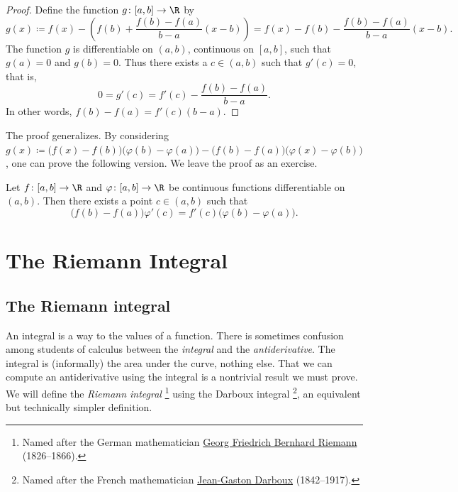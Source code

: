 \begin{proof}
Define the
function $g \colon [a,b] \to \R$ by
\begin{equation*}
g(x) \coloneqq
f(x)-
\left( f(b)+\frac{f(b)-f(a)}{b-a}(x-b) \right)
=
f(x)-
f(b)-\frac{f(b)-f(a)}{b-a}(x-b) .
\end{equation*}
The function $g$ is differentiable on $(a,b)$,
continuous on $[a,b]$, such that $g(a) = 0$ and $g(b) = 0$.  Thus there exists
a
$c \in (a,b)$ such that $g'(c) = 0$, that is,
\begin{equation*}
0 = g'(c) = f'(c)-\frac{f(b)-f(a)}{b-a} .
\end{equation*}
In other words,
$f(b)-f(a) = f'(c)(b-a)$.
\end{proof}

The proof generalizes.  By considering
$g(x) \coloneqq
\bigl(f(x)-f(b)\bigr)
\bigl(\varphi(b)-\varphi(a)\bigr)
-
\bigl(f(b)-f(a)\bigr)
\bigl(\varphi(x)-\varphi(b)\bigr)$,
one can prove the following version.  We leave the proof as an exercise.

\begin{thm} \label{thm:cauchymvt}
Let $f \colon [a,b] \to \R$ and $\varphi \colon [a,b] \to \R$ be continuous
functions
differentiable on $(a,b)$.  Then there exists a point $c \in (a,b)$
such that
\begin{equation*}
\bigl(f(b)-f(a)\bigr)\varphi'(c) = f'(c)\bigl(\varphi(b)-\varphi(a)\bigr) .
\end{equation*}
\end{thm}



\chapter{The Riemann Integral} \label{int:chapter}


\section{The Riemann integral}
\label{sec:rint}



An integral is a way to  the values of a function.
There is sometimes confusion among students of
calculus between the \emph{integral} and the \emph{antiderivative}.
The integral is (informally) the area under the curve, nothing else.
That we can compute an antiderivative using the integral is a nontrivial
result we must prove.  
We will define the \emph{Riemann integral}%
\footnote{Named after the German mathematician
\href{https://en.wikipedia.org/wiki/Riemann}{Georg Friedrich Bernhard Riemann}
(1826--1866).}
using the Darboux integral%
\footnote{Named after the French mathematician
\href{https://en.wikipedia.org/wiki/Darboux}{Jean-Gaston Darboux} (1842--1917).},
an equivalent but technically simpler definition.

